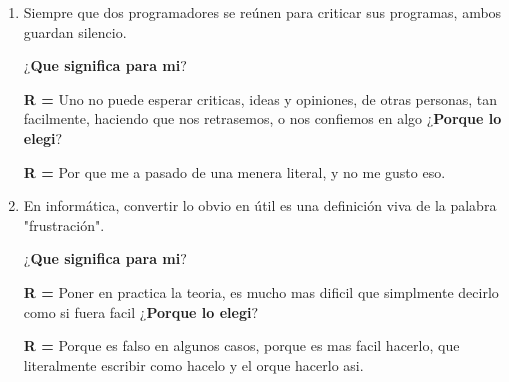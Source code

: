 \documentclass[letterpaper,12pt]{article}
\begin{document}
\begin{enumerate}
\item Siempre que dos programadores se reúnen para criticar sus programas, ambos guardan silencio.\par
\textbf{$¿$Que significa para mi$?$}\par
\textbf{R =} \text Uno no puede esperar criticas, ideas y opiniones, de otras personas, tan facilmente, haciendo que nos retrasemos, o nos confiemos en algo
\textbf{$¿$Porque lo elegi$?$}\par
\textbf{R =} \text Por que me a pasado de una menera literal, y no me gusto eso.

\item En informática, convertir lo obvio en útil es una definición viva de la palabra "frustración".\par
\textbf{$¿$Que significa para mi$?$}\par
\textbf{R =} \text Poner en practica la teoria, es mucho mas dificil que simplmente decirlo como si fuera facil
\textbf{$¿$Porque lo elegi$?$}\par
\textbf{R =} \text Porque es falso en algunos casos, porque es mas facil hacerlo, que literalmente escribir como hacelo y el orque hacerlo asi.
\end{enumerate}
\end{document}
